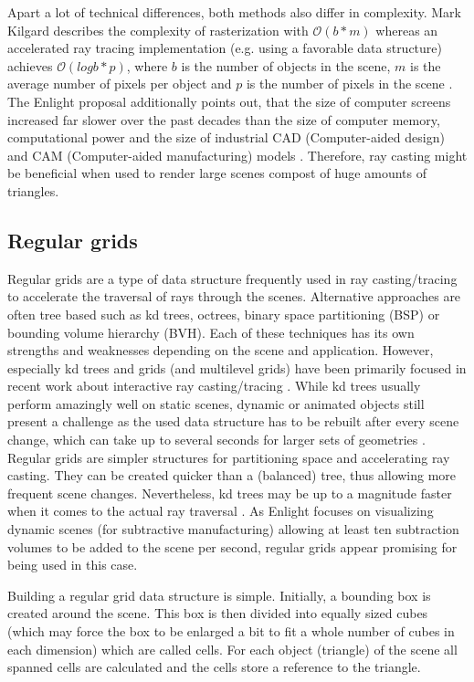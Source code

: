 Apart a lot of technical differences, both methods also differ in complexity. Mark Kilgard describes the complexity of rasterization with $\mathcal{O}(b * m)$ whereas an accelerated ray tracing implementation (e.g. using a favorable data structure) achieves $\mathcal{O}(log b * p)$, where $b$ is the number of objects in the scene, $m$ is the average number of pixels per object and $p$ is the number of pixels in the scene \cite[p.48]{ray_casting_presentation}. The Enlight proposal additionally points out, that the size of computer screens increased far slower over the past decades than the size of computer memory, computational power and the size of industrial CAD (Computer-aided design) and CAM (Computer-aided manufacturing) models \cite{enlight_proposal}. Therefore, ray casting might be beneficial when used to render large scenes compost of huge amounts of triangles.


\subsection{Regular grids}

Regular grids are a type of data structure frequently used in ray casting/tracing to accelerate the traversal of rays through the scenes. Alternative approaches are often tree based such as kd trees, octrees, binary space partitioning (BSP) or bounding volume hierarchy (BVH). Each of these techniques has its own strengths and weaknesses depending on the scene and application. However, especially kd trees and grids (and multilevel grids) have been primarily focused in recent work about interactive ray casting/tracing \cite[ch.1]{packet_caster}. While kd trees usually perform amazingly well on static scenes, dynamic or animated objects still present a challenge as the used data structure has to be rebuilt after every scene change, which can take up to several seconds for larger sets of geometries \cite[ch.1]{packet_caster}. Regular grids are simpler structures for partitioning space and accelerating ray casting. They can be created quicker than a (balanced) tree, thus allowing more frequent scene changes. Nevertheless, kd trees may be up to a magnitude faster when it comes to the actual ray traversal \cite[ch.1]{packet_caster}. As Enlight focuses on visualizing dynamic scenes (for subtractive manufacturing) allowing at least ten subtraction volumes to be added to the scene per second, regular grids appear promising for being used in this case.

Building a regular grid data structure is simple. Initially, a bounding box is created around the scene. This box is then divided into equally sized cubes (which may force the box to be enlarged a bit to fit a whole number of cubes in each dimension) which are called cells. For each object (triangle) of the scene all spanned cells are calculated and the cells store a reference to the triangle.

